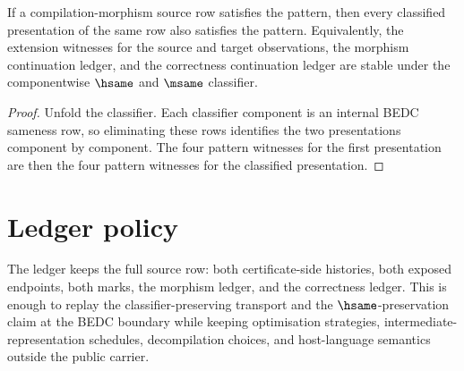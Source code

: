 \begin{theorem}
\label{thm:concrete-instances-compilation-morphism-stability}
If a compilation-morphism source row satisfies the pattern, then every classified presentation of the same row also satisfies the pattern. Equivalently, the extension witnesses for the source and target observations, the morphism continuation ledger, and the correctness continuation ledger are stable under the componentwise $\hsame$ and $\msame$ classifier.
\end{theorem}

\begin{proof}
Unfold the classifier. Each classifier component is an internal BEDC sameness row, so eliminating these rows identifies the two presentations component by component. The four pattern witnesses for the first presentation are then the four pattern witnesses for the classified presentation.
\end{proof}

\section{Ledger policy}
\label{sec:concrete-instances-compilation-morphism-ledger}

\begin{definition}
\label{def:concrete-instances-compilation-morphism-ledger}
The ledger keeps the full source row: both certificate-side histories, both exposed endpoints, both marks, the morphism ledger, and the correctness ledger. This is enough to replay the classifier-preserving transport and the $\hsame$-preservation claim at the BEDC boundary while keeping optimisation strategies, intermediate-representation schedules, decompilation choices, and host-language semantics outside the public carrier.
\end{definition}

\begin{closurestatus}{}
  \theoryclosure{\scopedClosure}
  \formalstatus{\theoremCheckedV}
\end{closurestatus}
